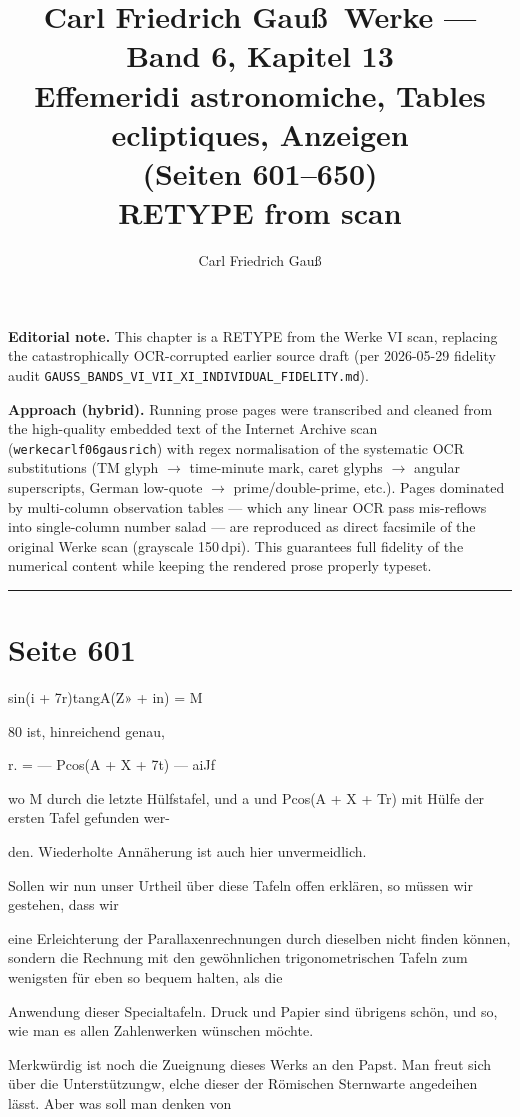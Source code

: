 \documentclass[10pt,a4paper]{article}
\title{Carl Friedrich Gau\ss\ Werke --- Band 6, Kapitel 13\\[1ex]\large{Effemeridi astronomiche, Tables ecliptiques, Anzeigen}\\[0.5ex]\large{(Seiten 601--650)} \\[0.5ex]\normalsize{RETYPE from scan}}
\author{Carl Friedrich Gau\ss}
\date{}
\begin{document}
\maketitle

\noindent\textbf{Editorial note.}
This chapter is a RETYPE from the Werke VI scan, replacing the
catastrophically OCR-corrupted earlier source draft (per 2026-05-29
fidelity audit \texttt{GAUSS\_BANDS\_VI\_VII\_XI\_INDIVIDUAL\_FIDELITY.md}).

\textbf{Approach (hybrid).} Running prose pages were transcribed and
cleaned from the high-quality embedded text of the Internet Archive
scan (\texttt{werkecarlf06gausrich}) with regex normalisation of
the systematic OCR substitutions (TM glyph $\to$ time-minute mark,
caret glyphs $\to$ angular superscripts, German low-quote $\to$ prime/double-prime, etc.).
Pages dominated by multi-column observation tables --- which any
linear OCR pass mis-reflows into single-column number salad ---
are reproduced as direct facsimile of the original Werke scan
(grayscale 150\,dpi). This guarantees full fidelity of the
numerical content while keeping the rendered prose properly typeset.
\bigskip\hrule\bigskip


\newpage
\section*{Seite 601}
sin(i + 7r)tangA(Z» + in) = M

80 ist, hinreichend genau,

r. = — Pcos(A + X + 7t) — aiJf

wo M durch die letzte Hülfstafel, und a und Pcos(A + X + Tr) mit Hülfe der ersten Tafel gefunden wer-

den. Wiederholte Annäherung ist auch hier unvermeidlich.

Sollen wir nun unser Urtheil über diese Tafeln offen erklären, so müssen wir gestehen, dass wir

eine Erleichterung der Parallaxenrechnungen durch dieselben nicht finden können, sondern die Rechnung mit den gewöhnlichen trigonometrischen Tafeln zum wenigsten für eben so bequem halten, als die

Anwendung dieser Specialtafeln. Druck und Papier sind übrigens schön, und so, wie man es allen Zahlenwerken wünschen möchte.

Merkwürdig ist noch die Zueignung dieses Werks an den Papst. Man freut sich über die Unterstützungw, elche dieser der Römischen Sternwarte angedeihen lässt. Aber was soll man denken von
\end{document}
